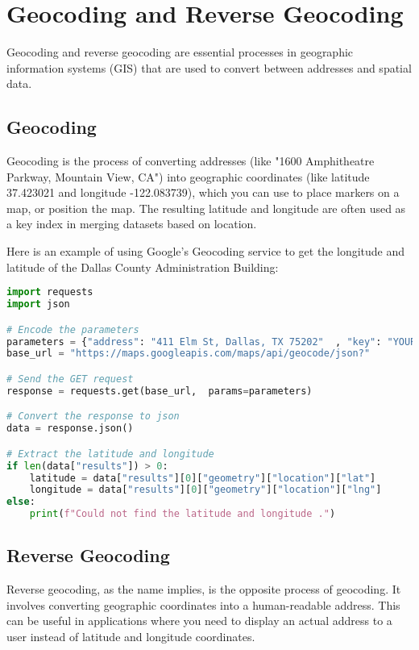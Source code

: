 \chapter{Geocoding and Reverse Geocoding}

Geocoding and reverse geocoding are essential processes in geographic information systems (GIS) that are used to convert between addresses and spatial data.

\section{Geocoding}

Geocoding is the process of converting addresses (like "1600 Amphitheatre Parkway, Mountain View, CA") into geographic coordinates (like latitude 37.423021 and longitude -122.083739), which you can use to place markers on a map, or position the map. The resulting latitude and longitude are often used as a key index in merging datasets based on location.

Here is an example of using Google's Geocoding service to get the longitude and latitude of the Dallas County Administration Building:

\begin{lstlisting}[language=Python]
import requests
import json

# Encode the parameters
parameters = {"address": "411 Elm St, Dallas, TX 75202"  , "key": "YOUR_API_KEY"}
base_url = "https://maps.googleapis.com/maps/api/geocode/json?"

# Send the GET request
response = requests.get(base_url,  params=parameters)

# Convert the response to json
data = response.json()

# Extract the latitude and longitude
if len(data["results"]) > 0:
    latitude = data["results"][0]["geometry"]["location"]["lat"]
    longitude = data["results"][0]["geometry"]["location"]["lng"]
else:
    print(f"Could not find the latitude and longitude .")
\end{lstlisting}

\section{Reverse Geocoding}

Reverse geocoding, as the name implies, is the opposite process of geocoding. It involves converting geographic coordinates into a human-readable address. This can be useful in applications where you need to display an actual address to a user instead of latitude and longitude coordinates.


